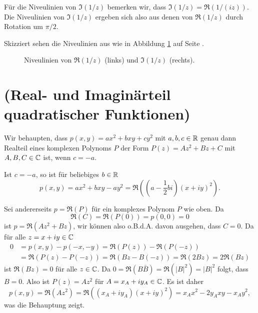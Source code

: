 \documentclass[a4paper,10pt]{article}
\begin{document}
Für die Niveulinien von $\Im(1/z)$ bemerken wir, dass $\Im(1/z) = \Re(1/(iz))$. Die Niveulinien von $\Im(1/z)$ ergeben sich also aus denen von $\Re(1/z)$ durch Rotation um $\pi/2$.

Skizziert sehen die Niveulinien aus wie in Abbildung \ref{fig: Niveulinien von 1/z} auf Seite \pageref{fig: Niveulinien von 1/z}.

\begin{figure}\centering
 \newcommand{\samplerate}{0}
 \caption{Niveulinien von $\Re(1/z)$ (links) und $\Im(1/z)$ (rechts).}
 \label{fig: Niveulinien von 1/z}
\end{figure}





\section{(Real- und Imaginärteil quadratischer Funktionen)}
Wir behaupten, dass $p(x,y) = ax^2 + bxy + cy^2$ mit $a,b,c \in \mathbb{R}$ genau dann Realteil eines komplexen Polynoms $P$ der Form $P(z) = Az^2 + Bz + C$ mit $A,B,C \in \mathbb{C}$ ist, wenn $c = -a$.

Ist $c = -a$, so ist für beliebiges $b \in \mathbb{R}$
\[
 p(x,y) = ax^2 + bxy - ay^2 = \Re\left(\left(a-\frac{1}{2}bi\right)(x+iy)^2\right).
\]

Sei andererseits $p = \Re(P)$ für ein komplexes Polynom $P$ wie oben. Da
\[
 \Re(C) = \Re(P(0)) = p(0,0) = 0
\]
ist $p = \Re(Az^2+Bz)$, wir können also o.B.d.A. davon ausgehen, dass $C=0$. Da für alle $z = x+iy \in \mathbb{C}$
\begin{align*}
 0 &= p(x,y) - p(-x,-y) = \Re(P(z))-\Re(P(-z)) \\
   &= \Re(P(z)-P(-z)) = \Re(Bz - B(-z)) = \Re(2Bz) = 2 \Re(Bz)
\end{align*}
ist $\Re(Bz) = 0$ für alle $z \in \mathbb{C}$. Da $0 = \Re(B \bar{B}) = \Re(|B|^2)= |B|^2$ folgt, dass $B = 0$. Also ist $P(z) = Az^2$ für $A = x_A + iy_A \in \mathbb{C}$. Es ist daher
\[
 p(x,y) = \Re(Az^2) = \Re((x_A+iy_A)(x+iy)^2) = x_Ax^2 - 2y_Axy - x_A y^2,
\]
was die Behauptung zeigt.
\end{document}
